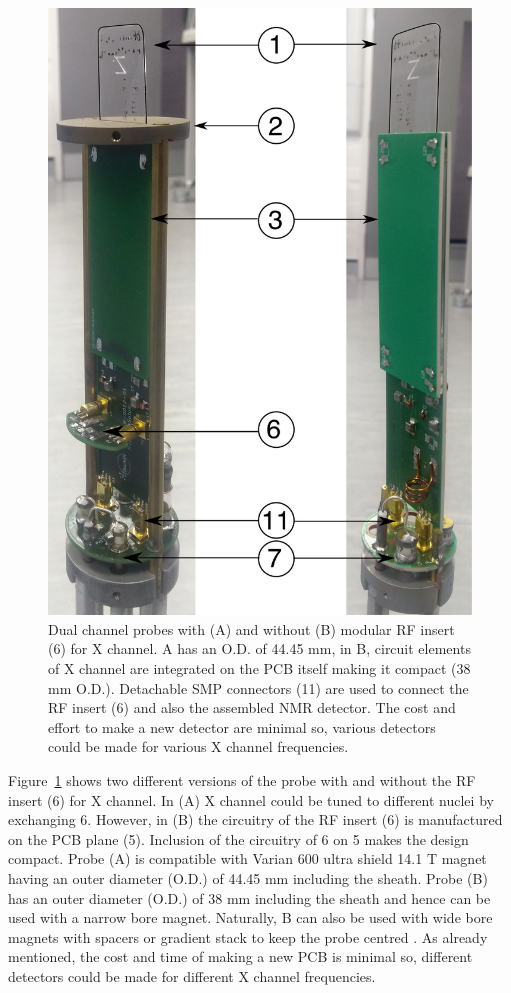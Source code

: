 \documentclass[preprint,12pt]{article}
\begin{document}
\begin{figure}
\centering
\includegraphics[width=.8\linewidth,keepaspectratio=true]{./figures/ms5n17-tlp-im-181007-both-detectors.png}
\caption{Dual channel probes with (A) and without (B) modular RF insert (6) for X channel. A has an O.D. of 44.45 mm, in B, circuit elements of X channel are integrated on the PCB itself making it compact (38 mm O.D.). Detachable SMP connectors (11) are used to connect the RF insert (6) and also the assembled NMR detector. The cost and effort to make a new detector are minimal so, various detectors could be made for various X channel frequencies.}
\label{fig:ProbePhoto}
\end{figure}
Figure~\ref{fig:ProbePhoto} shows two different versions of the probe with and without the RF insert (6) for X channel. In (A) X channel could be tuned to different nuclei by exchanging 6. However, in (B) the circuitry of the RF insert (6) is manufactured on the PCB plane (5). Inclusion of the circuitry of 6 on 5 makes the design compact. Probe (A) is compatible with Varian 600 ultra shield 14.1 T magnet having an outer diameter (O.D.) of 44.45 mm including the sheath. Probe (B) has an outer diameter (O.D.) of 38 mm including the sheath and hence can be used with a narrow bore magnet. Naturally, B can also be used with wide bore magnets with spacers or gradient stack to keep the probe centred . As already mentioned, the cost and time of making a new PCB is minimal so, different detectors could be made for different X channel frequencies.\par
\end{document}
